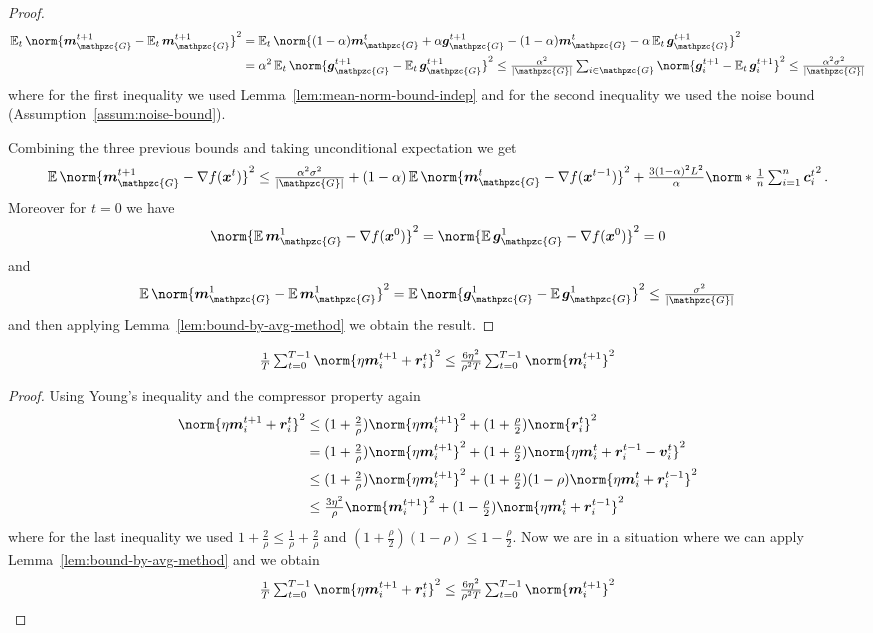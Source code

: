 \documentclass{article}
\newcommand{\gset}{\ensuremath{{\mathpzc{G}}}}
\begin{document}
\begin{proof}
  \begin{align*}
    \E_t \norm{ \mm_\gset^{t+1} - \E_t \mm_\gset^{t+1} }^2
     &=
    \E_t \norm{ (1-\alpha)\mm_\gset^{t} + \alpha\gg_\gset^{t+1} -(1-\alpha)\mm_\gset^{t}  - \alpha \E_t \gg_\gset^{t+1} }^2
    \\
     &=
    \alpha^2 \E_t \norm{ \gg_\gset^{t+1}  - \E_t \gg_\gset^{t+1} }^2    
     \le 
    \tfrac{\alpha^2}{|\gset|} \tsum_{i\in\gset} \norm{ \gg_i^{t+1}  - \E_t \gg_i^{t+1} }^2    
     \le
    \tfrac{\alpha^2 \sigma^2}{|\gset|}
  \end{align*}
  where for the first inequality we used Lemma~\ref{lem:mean-norm-bound-indep} and for the second inequality we used the noise bound (Assumption~\ref{assum:noise-bound}).
  
  Combining the three previous bounds and taking unconditional expectation we get
  \[
    \E \norm{ \mm_\gset^{t+1} - \nabla f(\xx^t) }^2
     \le
    \tfrac{\alpha^2 \sigma^2}{|\gset|}
    + (1-\alpha) \E \norm{\mm_\gset^{t} - \nabla f(\xx^{t-1})}^2 + \tfrac{3(1-\alpha)^2 L^2}{\alpha} \norm*{\tfrac{1}{n} \tsum_{i=1}^n \cc_i^t}^2 \, .
  \]
  Moreover for $t=0$ we have
  \[
    \norm{\E \mm_\gset^1 - \nabla f(\xx^0)}^2 = \norm{\E \gg_\gset^1 - \nabla f(\xx^0)}^2 = 0
  \]
  and
  \[
    \E \norm{ \mm_\gset^{1} - \E \mm_\gset^{1} }^2
     =
    \E \norm{ \gg_\gset^1 - \E \gg_\gset^1 }^2
     \le 
    \tfrac{\sigma^2}{|\gset|} 
  \]
  and then applying Lemma~\ref{lem:bound-by-avg-method} we obtain the result.
\end{proof}


\begin{lemma}\label{lem:m-plus-r-bound}
  \[
    \tfrac{1}{T} \tsum_{t=0}^{T-1} \norm{ \eta \mm_i^{t+1} + \bm r_i^t }^2
     \le 
    \tfrac{6 \eta^2}{\rho^2 T} \tsum_{t=0}^{T-1} \norm{ \mm_i^{t+1} }^2
  \]
\end{lemma}

\begin{proof}
Using Young's inequality and the compressor property again
  \begin{align*}
    \norm{ \eta \mm_i^{t+1} + \bm r_i^t }^2
     &\le
    (1+\tfrac{2}{\rho}) \norm{ \eta \mm_i^{t+1} }^2 + (1+\tfrac{\rho}{2}) \norm{ \bm r_i^t }^2
    \\
     &=
    (1+\tfrac{2}{\rho}) \norm{ \eta \mm_i^{t+1} }^2 + (1+\tfrac{\rho}{2}) \norm{ \eta \mm_i^t + \bm r_i^{t-1} - \vv_i^t }^2
    \\
     &\le
    (1+\tfrac{2}{\rho}) \norm{ \eta \mm_i^{t+1} }^2 + (1+\tfrac{\rho}{2})(1-\rho) \norm{ \eta \mm_i^t + \bm r_i^{t-1} }^2
    \\
     &\le
    \tfrac{3 \eta^2}{\rho} \norm{ \mm_i^{t+1} }^2 + (1-\tfrac{\rho}{2}) \norm{ \eta \mm_i^t + \bm r_i^{t-1} }^2
  \end{align*}
  where for the last inequality we used $1+\tfrac{2}{\rho} \le \tfrac{1}{\rho} + \tfrac{2}{\rho}$ and $(1+\tfrac{\rho}{2})(1-\rho) \le 1-\tfrac{\rho}{2}$. Now we are in a situation where we can apply Lemma~\ref{lem:bound-by-avg-method} and we obtain
  \[
    \tfrac{1}{T} \tsum_{t=0}^{T-1} \norm{ \eta \mm_i^{t+1} + \bm r_i^t }^2
     \le 
    \tfrac{6 \eta^2}{\rho^2 T} \tsum_{t=0}^{T-1} \norm{ \mm_i^{t+1} }^2
  \]
\end{proof}
\end{document}
